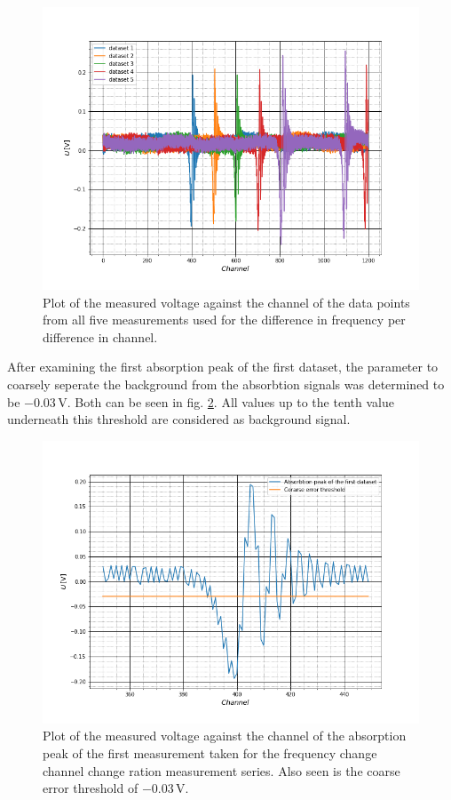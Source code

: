 \begin{figure}[h]
	\includegraphics[scale=0.5]{Bild/all_dx.png}
	\centering
	\caption[Plot of all data used for the discriminator determination]{Plot of the measured voltage against the channel of the data points from all five measurements used for the difference in frequency per difference in channel.}
	\label{all_dx}
\end{figure}

After examining the first absorption peak of the first dataset, the parameter to coarsely seperate the background from the absorbtion signals was determined to be $-0.03\,$V. Both can be seen in fig. \ref{absorbtionpeak}. All values up to the tenth value underneath this threshold are considered as background signal.\par
\begin{figure}[h]
	\includegraphics[scale=0.5]{Bild/peak_first_single.png}
	\centering
	\caption[Plot of an absorption peak]{Plot of the measured voltage against the channel of the absorption peak of the first measurement taken for the frequency change channel change ration measurement series. Also seen is the coarse error threshold of $-0.03\,$V.}
	\label{absorbtionpeak}
\end{figure}

